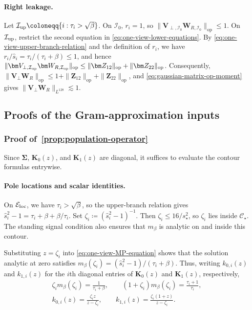 \documentclass[11pt]{article}
\newcommand{\cE}{\mathcal{E}}
\newcommand{\cI}{\mathcal{I}}
\begin{document}
\paragraph{Right leakage.}
Let $\cI_{\rm up}\coloneqq\{i:\tau_i>\sqrt\beta\}$.
On $\cI_0$, $r_i=1$, so
$\|\bm V_{\perp,\cI_0}\bm W_{R,\cI_0}\|_{\mathrm{op}}\le1$.
On $\cI_{\rm up}$, restrict the second equation in
\cref{eq:one-view-lower-equations}.  By
\cref{eq:one-view-upper-branch-relation} and the definition of $r_i$,
we have $r_i/\widehat s_i=\tau_i/(\tau_i+\beta)\le1$, and hence
$\|\bm V_{\perp,\cI_{\rm up}}\bm W_{R,\cI_{\rm up}}\|_{\mathrm{op}}
\le
\|\bm Z_{12}\|_{\mathrm{op}}+\|\bm Z_{22}\|_{\mathrm{op}}$.
Consequently,
$\|\bm V_\perp\bm W_R\|_{\mathrm{op}}
\le
1+\|\bm Z_{12}\|_{\mathrm{op}}+\|\bm Z_{22}\|_{\mathrm{op}}$,
and \cref{eq:gaussian-matrix-op-moment} gives
$\|\bm V_\perp\bm W_R\|_{L^{128}}\lesssim1$.

\subsection{Proofs of the Gram-approximation inputs}
\subsubsection{Proof of~\cref{prop:population-operator}}
Since $\bm\Sigma$, $\bm{K}_0(z)$, and $\bm{K}_1(z)$ are diagonal, it
suffices to evaluate the contour formulas entrywise.

\paragraph{Pole locations and scalar identities.}
On $\cE_{\rm loc}$, we have $\tau_i>\sqrt\beta$, so the upper-branch
relation gives
$\widehat s_i^2-1=\tau_i+\beta+\beta/\tau_i$.  Set
$\zeta_i\coloneqq(\widehat s_i^2-1)^{-1}$.  Then
$\zeta_i\le16/s_\star^2$, so $\zeta_i$ lies inside
$\mathcal C_\star$.  The standing signal condition also ensures that
$m_\beta$ is analytic on and inside this contour.

Substituting $z=\zeta_i$ into \cref{eq:one-view-MP-equation} shows that
the solution analytic at zero satisfies
$m_\beta(\zeta_i)=(\widehat s_i^2-1)/(\tau_i+\beta)$.  Thus, writing
$k_{0,i}(z)$ and $k_{1,i}(z)$ for the $i$th diagonal entries of
$\bm{K}_0(z)$ and $\bm{K}_1(z)$, respectively,
\begin{equation}
\label{eq:one-view-population-contour-scalar-identities}
\begin{gathered}
  \zeta_i m_\beta(\zeta_i)
  =
  \frac{1}{\tau_i+\beta},
  \qquad
  (1+\zeta_i)m_\beta(\zeta_i)
  =
  \frac{\tau_i+1}{\tau_i},
  \\
  k_{0,i}(z)
  =
  \frac{\zeta_i z}{z-\zeta_i},
  \qquad
  k_{1,i}(z)
  =
  \frac{\zeta_i(1+z)}{z-\zeta_i}.
\end{gathered}
\end{equation}
\end{document}
